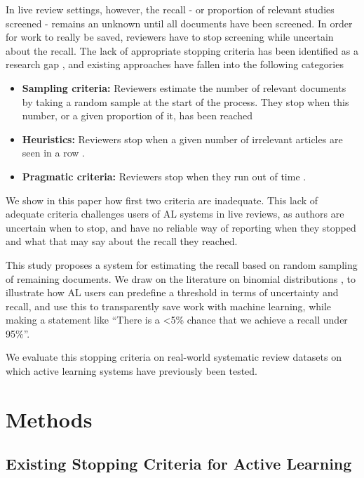 \documentclass{bmcart}
\begin{document}
	In live review settings, however, the recall - or proportion of relevant studies screened - remains an unknown until all documents have been screened. 
	In order for work to really be saved, reviewers have to stop screening while uncertain about the recall. 
	The lack of appropriate stopping criteria has been identified as a research gap \cite{bannach-brown2019}, and existing approaches have fallen into the following categories
	\begin{itemize}
		\item \textbf{Sampling criteria:} Reviewers estimate the number of relevant documents by taking a random sample at the start of the process. They stop when this number, or a given proportion of it, has been reached \cite{Shemilt2014}
		\item \textbf{Heuristics:} Reviewers stop when a given number of irrelevant articles are seen in a row \cite{Przybya2018}. 
		\item \textbf{Pragmatic criteria:} Reviewers stop when they run out of time \cite{miwa2014}. 
	\end{itemize}
	
	We show in this paper how first two criteria are inadequate.
	This lack of adequate criteria challenges users of AL systems in live reviews, as authors are uncertain when to stop, and have no reliable way of reporting when they stopped and what that may say about the recall they reached. 
	
	This study proposes a system for estimating the recall based on random sampling of remaining documents. 
	We draw on the literature on binomial distributions \cite{Brown2001}, to illustrate how AL users can predefine a threshold in terms of uncertainty and recall, and use this to transparently save work with machine learning, while making a statement like ``There is a <5\% chance that we achieve a recall under 95\%''.
	
	We evaluate this stopping criteria on real-world systematic review datasets on which active learning systems have previously been tested.
	
	\section*{Methods}
	
	\subsection*{Existing Stopping Criteria for Active Learning}
	
\end{document}
